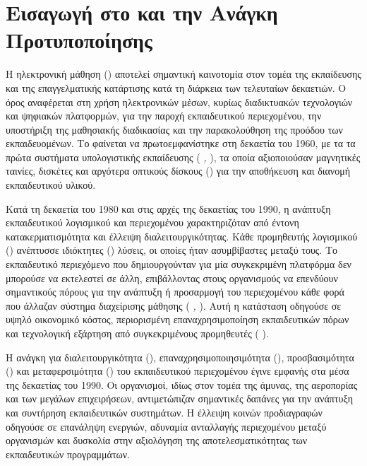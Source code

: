 \section{Εισαγωγή στο  και την Ανάγκη Προτυποποίησης}
\label{sec:elearning_intro}

Η ηλεκτρονική μάθηση (\textit{}) αποτελεί σημαντική καινοτομία στον τομέα της εκπαίδευσης και της 
επαγγελματικής κατάρτισης κατά τη διάρκεια των τελευταίων δεκαετιών. Ο όρος \textit{} αναφέρεται
στη χρήση ηλεκτρονικών μέσων, κυρίως διαδικτυακών τεχνολογιών και ψηφιακών πλατφορμών, για την παροχή εκπαιδευτικού περιεχομένου,
την υποστήριξη της μαθησιακής διαδικασίας και την παρακολούθηση της προόδου των εκπαιδευομένων. Το  φαίνεται
να πρωτοεμφανίστηκε στη δεκαετία του 1960, με τα τα πρώτα συστήματα υπολογιστικής εκπαίδευσης (\textit{ ,
}), τα οποία αξιοποιούσαν μαγνητικές ταινίες, δισκέτες και αργότερα οπτικούς δίσκους () για την αποθήκευση και διανομή
εκπαιδευτικού υλικού.

Κατά τη δεκαετία του 1980 και στις αρχές της δεκαετίας του 1990, η ανάπτυξη εκπαιδευτικού λογισμικού και περιεχομένου χαρακτηριζόταν από έντονη 
κατακερματισμότητα και έλλειψη διαλειτουργικότητας. Κάθε προμηθευτής λογισμικού (\textit{}) ανέπτυσσε ιδιόκτητες (\textit{})
λύσεις, οι οποίες ήταν ασυμβίβαστες μεταξύ τους. Το εκπαιδευτικό περιεχόμενο που δημιουργούνταν για μία συγκεκριμένη πλατφόρμα δεν μπορούσε να εκτελεστεί
σε άλλη, επιβάλλοντας στους οργανισμούς να επενδύουν σημαντικούς πόρους για την ανάπτυξη ή προσαρμογή του περιεχομένου κάθε φορά που άλλαζαν σύστημα
διαχείρισης μάθησης (\textit{  , }). Αυτή η κατάσταση οδηγούσε σε υψηλό οικονομικό κόστος,
περιορισμένη επαναχρησιμοποίηση εκπαιδευτικών πόρων και τεχνολογική εξάρτηση από συγκεκριμένους προμηθευτές (\textit{ }).

Η ανάγκη για διαλειτουργικότητα (\textit{}), επαναχρησιμοποιησιμότητα (\textit{}),
προσβασιμότητα (\textit{}) και μεταφερσιμότητα (\textit{}) του εκπαιδευτικού περιεχομένου έγινε εμφανής
στα μέσα της δεκαετίας του 1990. Οι οργανισμοί, ιδίως στον τομέα της άμυνας, της αεροπορίας και των μεγάλων επιχειρήσεων, αντιμετώπιζαν
σημαντικές δαπάνες για την ανάπτυξη και συντήρηση εκπαιδευτικών συστημάτων. Η έλλειψη κοινών προδιαγραφών οδηγούσε σε επανάληψη ενεργιών, 
αδυναμία ανταλλαγής περιεχομένου μεταξύ οργανισμών και δυσκολία στην αξιολόγηση της αποτελεσματικότητας των εκπαιδευτικών προγραμμάτων.

